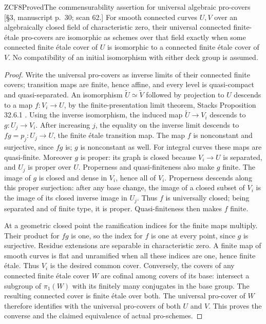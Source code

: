 \begin{result}{ZCF8}{Proved}{The commensurability assertion for universal algebraic pro-covers}
\textup{[\S3, manuscript p.\ 30; scan 62.]}
For smooth connected curves $U,V$ over an algebraically closed
field of characteristic zero, their universal connected finite-\'etale
pro-covers are isomorphic as schemes over that field exactly when
some connected finite \'etale cover of $U$ is isomorphic to a
connected finite \'etale cover of $V$. No compatibility of an
initial isomorphism with either deck group is assumed.
\end{result}
\begin{proof}
Write the universal pro-covers as inverse limits of their connected
finite covers; transition maps are finite, hence affine, and every
level is quasi-compact and quasi-separated. An isomorphism
$\widetilde U\simeq\widetilde V$ followed by projection to $U$
descends to a map $f:V_i\to U$, by the finite-presentation limit
theorem, Stacks Proposition 32.6.1 \cite{CF_StacksLimits}.
Using the inverse isomorphism, the induced map
$\widetilde U\to V_i$ descends to $g:U_j\to V_i$.
After increasing $j$, the equality on the inverse limit descends
to $fg=p_j:U_j\to U$, the finite \'etale transition map.
The map $f$ is nonconstant and surjective, since $fg$ is;
$g$ is nonconstant as well. For integral curves these maps are
quasi-finite. Moreover $g$ is proper: its graph is closed because
$V_i\to U$ is separated, and $U_j$ is proper over $U$.
Properness and quasi-finiteness also make $g$ finite. The image of $g$ is closed and dense in $V_i$, hence all of $V_i$.
Properness descends along this proper surjection: after any base
change, the image of a closed subset of $V_i$ is the image of its
closed inverse image in $U_j$. Thus $f$ is universally closed;
being separated and of finite type, it is proper. Quasi-finiteness
then makes $f$ finite.

At a geometric closed point the ramification indices for the
finite maps multiply. Their product for $fg$ is one, so the index
for $f$ is one at every point, since $g$ is surjective. Residue
extensions are separable in characteristic zero. A finite map of
smooth curves is flat and unramified when all these indices are
one, hence finite \'etale. Thus $V_i$ is the desired common cover.
Conversely, the covers of any connected finite \'etale cover $W$
are cofinal among covers of its base: intersect a subgroup of
$\pi_1(W)$ with its finitely many conjugates in the base group.
The resulting connected cover is finite \'etale over both. The
universal pro-cover of $W$ therefore identifies with the universal
pro-covers of both $U$ and $V$. This proves the converse and the
claimed equivalence of actual pro-schemes.
\end{proof}

